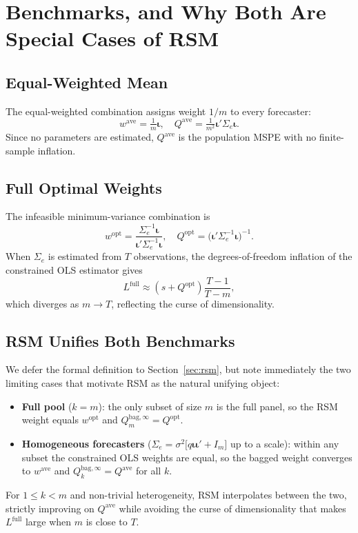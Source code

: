 \documentclass[12pt,a4paper]{article}
\theoremstyle{definition}
\newcommand{\Sig}{\Sigma_e}
\newcommand{\wopt}{w^{\mathrm{opt}}}
\newcommand{\wave}{w^{\mathrm{ave}}}
\newcommand{\Qopt}{Q^{\mathrm{opt}}}
\newcommand{\Qave}{Q^{\mathrm{ave}}}
\begin{document}
\section{Benchmarks, and Why Both Are Special Cases of RSM}
\label{sec:bench}

\subsection{Equal-Weighted Mean}

The equal-weighted combination assigns weight $1/m$ to every forecaster:
\begin{equation}
  \wave = \tfrac{1}{m}\bm{\iota},\quad
  \Qave = \tfrac{1}{m^2}\bm{\iota}'\Sig\bm{\iota}.
\end{equation}
Since no parameters are estimated, $\Qave$ is the population MSPE with no
finite-sample inflation.

\subsection{Full Optimal Weights}

The infeasible minimum-variance combination is
\begin{equation}\label{eq:wopt}
  \wopt = \frac{\Sig^{-1}\bm{\iota}}{\bm{\iota}'\Sig^{-1}\bm{\iota}},\quad
  \Qopt = \bigl(\bm{\iota}'\Sig^{-1}\bm{\iota}\bigr)^{-1}.
\end{equation}
When $\Sig$ is estimated from $T$ observations, the degrees-of-freedom
inflation of the constrained OLS estimator gives
\begin{equation}\label{eq:Lopt}
  L^{\mathrm{full}} \approx (s+\Qopt)\frac{T-1}{T-m},
\end{equation}
which diverges as $m\to T$, reflecting the curse of dimensionality.

\subsection{RSM Unifies Both Benchmarks}

We defer the formal definition to Section~\ref{sec:rsm}, but note
immediately the two limiting cases that motivate RSM as the natural
unifying object:
\begin{itemize}[nosep]
  \item \textbf{Full pool} ($k=m$): the only subset of size $m$ is the
    full panel, so the RSM weight equals $\wopt$ and
    $Q_m^{\mathrm{bag},\infty}=\Qopt$.
  \item \textbf{Homogeneous forecasters} ($\Sig=\sigma^2\bigl[q\bm{\iota}\bm{\iota}'+I_m\bigr]$
    up to a scale): within any subset the constrained OLS weights are
    equal, so the bagged weight converges to $\wave$ and
    $Q_k^{\mathrm{bag},\infty}=\Qave$ for all $k$.
\end{itemize}
For $1\le k<m$ and non-trivial heterogeneity, RSM interpolates between
the two, strictly improving on $\Qave$ while avoiding the curse of
dimensionality that makes $L^{\mathrm{full}}$ large when $m$ is close to $T$.
\end{document}
